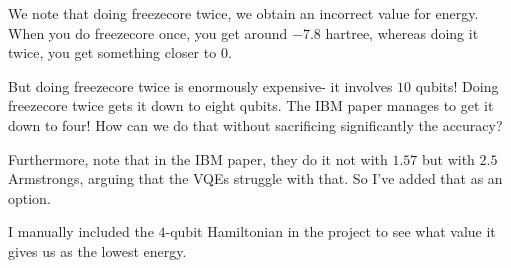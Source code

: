 \documentclass[]{article}
\title{}
\author{Sean Thrasher}
\theoremstyle{definition}
\begin{document}
\maketitle

\begin{abstract}

\end{abstract}

We note that doing freezecore twice, we obtain an incorrect value for energy. When you do freezecore once, you get around $ -7.8 $ hartree, whereas doing it twice, you get something closer to $ 0 $. 

But doing freezecore twice is enormously expensive- it involves $ 10 $ qubits! Doing freezecore twice gets it down to eight qubits. The IBM paper manages to get it down to four! How can we do that without sacrificing significantly the accuracy? 

Furthermore, note that in the IBM paper, they do it not with $ 1.57 $ but with $ 2.5 $ Armstrongs, arguing that the VQEs struggle with that. So I've added that as an option. 

I manually included the $ 4 $-qubit Hamiltonian in the project to see what value it gives us as the lowest energy. 


\printbibliography
\end{document}
